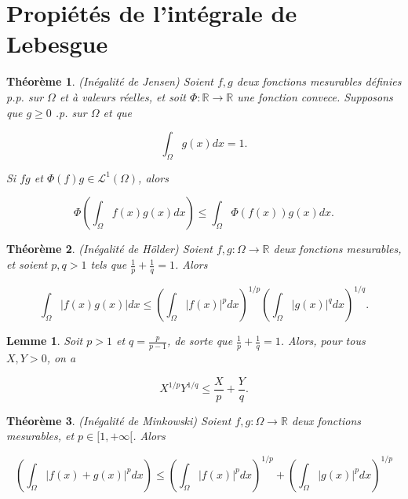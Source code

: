 \documentclass[10pt,a4paper,oneside]{article}
\newtheorem{theoreme}{Théorème}
\newtheorem{lemme}{Lemme}
\begin{document}
\section{Propiétés de l'intégrale de Lebesgue}

\begin{theoreme}
(Inégalité de Jensen)
Soient $f,g$ deux fonctions mesurables définies p.p. sur $\Omega$ et à valeurs réelles, et soit $\Phi : \mathbb{R} \to \mathbb{R}$ une fonction convece. Supposons que $g \geq 0$ .p. sur $\Omega$ et que

\[ \int_\Omega g(x) dx = 1. \]

Si $fg$ et $\Phi(f)g \in \mathcal{L}^1(\Omega)$, alors

\[ \Phi \left( \int_\Omega f(x)g(x) dx \right) \leq \int_\Omega \Phi(f(x))g(x) dx. \]
\end{theoreme}

\begin{theoreme}
(Inégalité de Hölder)
Soient $f,g : \Omega \to \mathbb{R}$ deux fonctions mesurables, et soient $p,q > 1$ tels que $\frac{1}{p} + \frac{1}{q} = 1$. Alors

\[ \int_\Omega |f(x) g(x)|dx \leq \left( \int_\Omega |f(x)|^p dx \right)^{1 / p} \left( \int_\Omega |g(x)|^q dx \right)^{1 / q}. \]
\end{theoreme}

\begin{lemme}
Soit $p > 1$ et $q = \frac{p}{p - 1}$, de sorte que $\frac{1}{p} + \frac{1}{q} = 1$. Alors, pour tous $X,Y > 0$, on a

\[ X^{1 / p} Y^{1/ q} \leq \frac{X}{p} + \frac{Y}{q}. \]
\end{lemme}

\begin{theoreme}
(Inégalité de Minkowski)
Soient $f, g : \Omega \to \mathbb{R}$ deux fonctions mesurables, et $p \in [1,+\infty[$. Alors

\[ \left( \int_\Omega |f(x) + g(x)|^p dx \right) \leq \left( \int_\Omega |f(x)|^p dx \right)^{1 / p} + \left( \int_\Omega |g(x)|^p dx \right)^{1 / p} \]
\end{theoreme}
\end{document}
